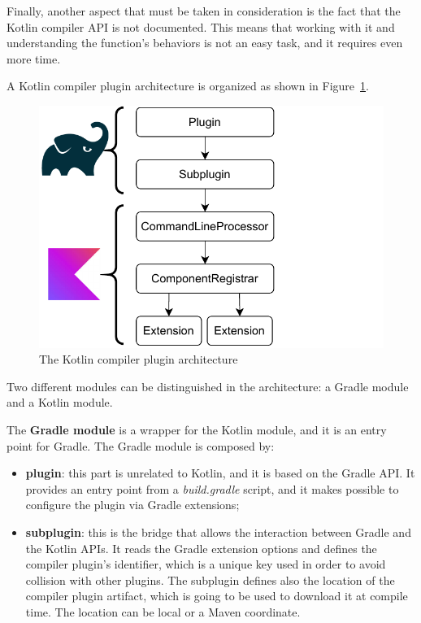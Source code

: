 Finally, another aspect that must be taken in consideration is the fact that the Kotlin compiler API is not documented. This means that working with it and understanding the function's behaviors is not an easy task, and it requires even more time.

A Kotlin compiler plugin architecture is organized as shown in Figure~\ref{fig:kotlin_compiler_plugin_architecture}.

\begin{figure}[!ht]
    \centering
    \includegraphics[scale=1]{document/chapters/2-metaprogramming/images/kotlin_compiler_plugin_architecture.pdf}
    \caption{The Kotlin compiler plugin architecture~\cite{compiler_plugins_jetbrains}}
    \label{fig:kotlin_compiler_plugin_architecture}
\end{figure}

Two different modules can be distinguished in the architecture: a Gradle module and a Kotlin module.

The \textbf{Gradle module} is a wrapper for the Kotlin module, and it is an entry point for Gradle. The Gradle module is composed by:
\begin{itemize}
    \item \textbf{plugin}: this part is unrelated to Kotlin, and it is based on the Gradle API. It provides an entry point from a \textit{build.gradle} script, and it makes possible to configure the plugin via Gradle extensions;
    \item \textbf{subplugin}: this is the bridge that allows the interaction between Gradle and the Kotlin APIs. It reads the Gradle extension options and defines the compiler plugin's identifier, which is a unique key used in order to avoid collision with other plugins. The subplugin defines also the location of the compiler plugin artifact, which is going to be used to download it at compile time. The location can be local or a Maven coordinate.
\end{itemize}

